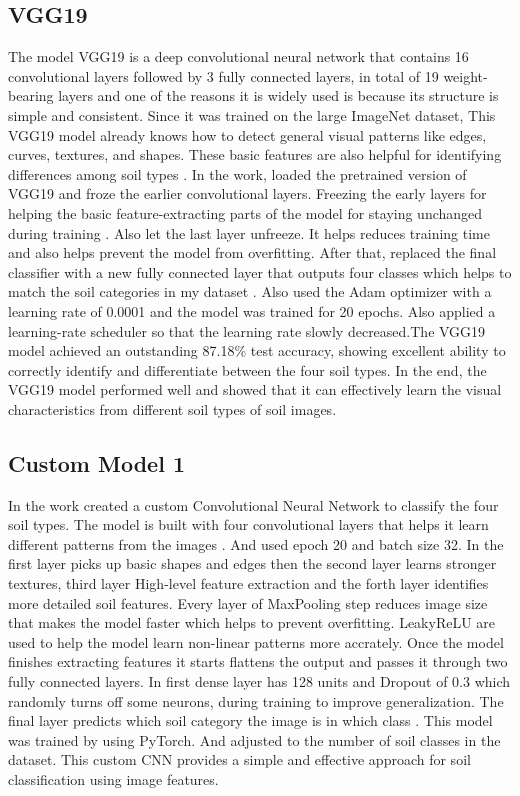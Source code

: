 \documentclass[conference]{IEEEtran}
\begin{document}
\subsection{VGG19}
The model VGG19 is a deep convolutional neural network that contains 16 convolutional layers followed by 3 fully connected layers,  in total of 19 weight-bearing layers and one of the reasons it is widely used is because its structure is simple and consistent. Since it was trained on the large ImageNet dataset, This VGG19 model already knows how to detect general visual patterns like edges, curves, textures, and shapes. These basic features are also helpful for identifying differences among soil types \cite{b27}. In the work, loaded the pretrained version of VGG19 and froze the earlier convolutional layers. Freezing the early layers for helping the basic feature-extracting parts of the model for staying unchanged during training \cite{b12}. Also let the last layer unfreeze. It helps reduces training time and also helps prevent the model from overfitting. After that, replaced the final classifier with a new fully connected layer that outputs four classes which helps to match the soil categories in my dataset \cite{b10}. Also used the Adam optimizer with a learning rate of 0.0001 and the model was trained for 20 epochs. Also applied a learning-rate scheduler so that the learning rate slowly decreased.The VGG19 model achieved an outstanding 87.18\% test accuracy, showing excellent ability to correctly identify and differentiate between the four soil types. In the end, the VGG19 model performed well and showed that it can effectively learn the visual characteristics from different soil types of soil images.

\subsection{Custom Model 1}
In the work created a custom Convolutional Neural Network to classify the four soil types. The model is built with four convolutional layers that helps it learn different patterns from the images \cite{b6}\cite{b8}. And used epoch 20 and batch size 32. In the first layer picks up basic shapes and edges then the second layer learns stronger textures, third layer High-level feature extraction and the forth layer identifies more detailed soil features. Every layer of MaxPooling step reduces image size that makes the model faster which helps to prevent overfitting. LeakyReLU are used to help the model learn non-linear patterns more accrately.
Once the model finishes extracting features it starts flattens the output and passes it through two fully connected layers. In first dense layer has 128 units and Dropout of 0.3 which randomly turns off some neurons, during training to improve generalization. The final layer predicts which soil category the image is in which class \cite{b3}. This model was trained by using PyTorch. And adjusted to the number of soil classes in the dataset. This custom CNN provides a simple and effective approach for soil classification using image features.
\end{document}
